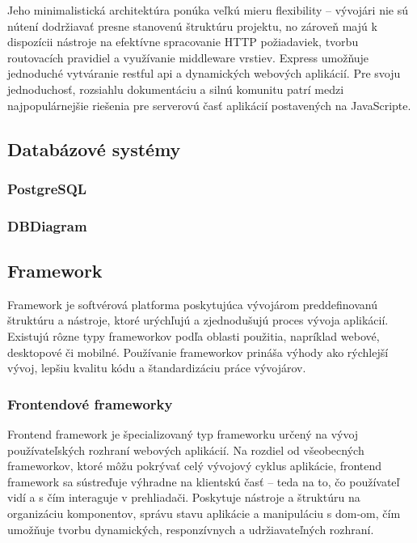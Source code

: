 Jeho minimalistická architektúra ponúka veľkú mieru flexibility – vývojári nie sú nútení dodržiavať presne stanovenú štruktúru projektu, no zároveň majú k dispozícii nástroje na efektívne spracovanie HTTP požiadaviek, tvorbu routovacích pravidiel a využívanie middleware vrstiev. Express umožňuje jednoduché vytváranie \acrshort{rest}ful \acrshort{api} a dynamických webových aplikácií. Pre svoju jednoduchosť, rozsiahlu dokumentáciu a silnú komunitu patrí medzi najpopulárnejšie riešenia pre serverovú časť aplikácií postavených na JavaScripte.\cite{express}\cite{backendframework}
\subsection{Databázové systémy}
\subsubsection{PostgreSQL}
\subsubsection{DBDiagram}
\subsection{Framework}
Framework je softvérová platforma poskytujúca vývojárom preddefinovanú štruktúru a nástroje, ktoré urýchľujú a zjednodušujú proces vývoja aplikácií.
 Existujú rôzne typy frameworkov podľa oblasti použitia, napríklad webové, desktopové či mobilné.
 Používanie frameworkov prináša výhody ako rýchlejší vývoj, lepšiu kvalitu kódu a štandardizáciu práce vývojárov. \cite{framework}
\subsubsection{Frontendové frameworky}
Frontend framework je špecializovaný typ frameworku určený na vývoj používateľských rozhraní webových aplikácií.
 Na rozdiel od všeobecných frameworkov, ktoré môžu pokrývať celý vývojový cyklus aplikácie, frontend framework sa sústreďuje výhradne na klientskú časť – teda na to, čo používateľ vidí a s čím interaguje v prehliadači.
  Poskytuje nástroje a štruktúru na organizáciu komponentov, správu stavu aplikácie a manipuláciu s \acrshort{dom}-om, čím umožňuje tvorbu dynamických, responzívnych a udržiavateľných rozhraní.
